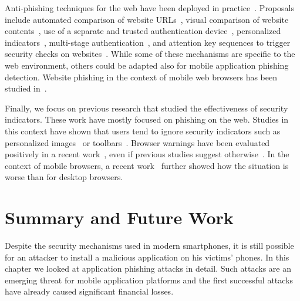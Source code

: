Anti-phishing techniques for the web have been deployed in practice~\cite{dhamija06chi,hong12cacm}.
Proposals include automated comparison of website URLs~\cite{maurer-css12},
visual comparison of website contents~\cite{chen10tit, yue-www07},
use of a separate and trusted authentication device~\cite{parno06fc},
personalized indicators~\cite{dhamija05soups,schechter07sp,lee-w2sp14},
multi-stage authentication~\cite{herzberg12},
and attention key sequences to trigger security checks on websites~\cite{wu-soups06}.
While some of these mechanisms are specific to the web environment, others could be adapted also for mobile application phishing detection. Website phishing in the context of mobile web
browsers has been studied in~\cite{niu-upsec08,rydstedt-woot10}.

Finally, we focus on previous research that studied the effectiveness of security indicators. These work have mostly focused on phishing on the web.
Studies in this context have shown that users tend to ignore security indicators such as personalized images~\cite{schechter07sp,lee-w2sp14} or toolbars~\cite{wu-chi06, jackson-fincrypto07}.
Browser warnings have been evaluated positively in a recent work~\cite{akhawe13usenix}, even if previous studies suggest otherwise~\cite{sunshine-usenix09,egelman2008chi,dhamija06chi}. In the context of mobile browsers, a recent work~\cite{traynorimc} further showed how the situation is worse than for desktop browsers.

\section{Summary and Future Work}

Despite the security mechanisms used in modern smartphones, it is still possible for an attacker to install a malicious application on his victims' phones. In this chapter we looked at application phishing attacks in detail. Such attacks are an emerging threat for mobile application platforms and the first successful attacks have already caused significant financial losses.

